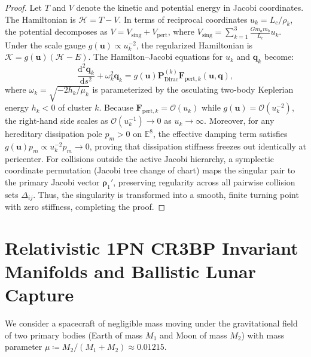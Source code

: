 \documentclass[11pt,a4paper,reqno]{article}
\theoremstyle{plain}
\theoremstyle{definition}
\theoremstyle{remark}
\numberwithin{equation}{section}
\providecommand{\diff}{\mathrm{d}}
\begin{document}
\begin{proof}
Let $T$ and $V$ denote the kinetic and potential energy in Jacobi coordinates. The Hamiltonian is $\mathcal{H} = T - V$. In terms of reciprocal coordinates $u_k = L_c / \rho_k$, the potential decomposes as $V = V_{\mathrm{sing}} + V_{\mathrm{pert}}$, where $V_{\mathrm{sing}} = \sum_{k=1}^3 \frac{G m_a m_b}{L_c} u_k$.
Under the scale gauge $g(\bm{u}) \propto u_k^{-2}$, the regularized Hamiltonian is $\mathcal{K} = g(\bm{u})(\mathcal{H} - E)$. The Hamilton--Jacobi equations for $u_k$ and $\bm{q}_k$ become:
\begin{equation}
  \frac{\diff^2 \bm{q}_k}{\diff s^2} + \omega_k^2 \bm{q}_k = g(\bm{u}) \mathbf{P}_{\mathrm{Dirac}}^{(k)} \bm{F}_{\mathrm{pert}, k}(\bm{u}, \bm{q}),
\end{equation}
where $\omega_k = \sqrt{-2 h_k / \mu_k}$ is parameterized by the osculating two-body Keplerian energy $h_k < 0$ of cluster $k$. Because $\bm{F}_{\mathrm{pert}, k} = \mathcal{O}(u_k)$ while $g(\bm{u}) = \mathcal{O}(u_k^{-2})$, the right-hand side scales as $\mathcal{O}(u_k^{-1}) \to 0$ as $u_k \to \infty$. Moreover, for any hereditary dissipation pole $p_m > 0$ on $\mathbb{E}^8$, the effective damping term satisfies $g(\bm{u}) p_m \propto u_k^{-2} p_m \to 0$, proving that dissipation stiffness freezes out identically at pericenter. For collisions outside the active Jacobi hierarchy, a symplectic coordinate permutation (Jacobi tree change of chart) maps the singular pair to the primary Jacobi vector $\bm{\rho}_1'$, preserving regularity across all pairwise collision sets $\Delta_{ij}$. Thus, the singularity is transformed into a smooth, finite turning point with zero stiffness, completing the proof.
\end{proof}

\section{Relativistic 1PN CR3BP Invariant Manifolds and Ballistic Lunar Capture}
\label{sec:relativistic_cr3bp_manifolds}

We consider a spacecraft of negligible mass moving under the gravitational field of two primary bodies (Earth of mass $M_1$ and Moon of mass $M_2$) with mass parameter $\mu \coloneqq M_2 / (M_1 + M_2) \approx 0.01215$.
\end{document}
